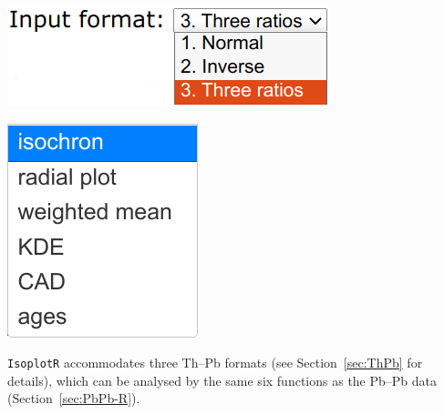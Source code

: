 \begin{refsection}
\noindent\begin{minipage}[t]{.3\linewidth}
\strut\vspace*{-\baselineskip}\newline
\includegraphics[width=\linewidth]{../figures/PbPbFormats.png}
\end{minipage}
\noindent\begin{minipage}[t]{.15\linewidth}
\strut\vspace*{-\baselineskip}\newline
\includegraphics[width=\linewidth]{../figures/PbPbPlotdevices.png}\\
\end{minipage}
\begin{minipage}[t]{.55\textwidth}
  \texttt{IsoplotR} accommodates three Th--Pb formats (see
  Section~\ref{sec:ThPb} for details), which can be analysed by the
  same six functions as the Pb--Pb data (Section~\ref{sec:PbPb-R}).
\end{minipage}


\end{refsection}
